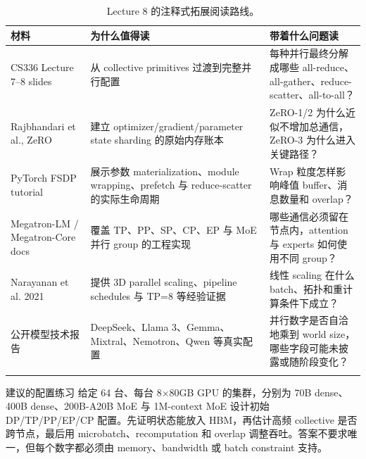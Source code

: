 \documentclass[a4paper]{article}
\begin{document}
\begin{longtable}{L{0.23\textwidth}L{0.31\textwidth}L{0.36\textwidth}}
\toprule
材料 & 为什么值得读 & 带着什么问题读 \\
\midrule
CS336 Lecture 7--8 slides & 从 collective primitives 过渡到完整并行配置 & 每种并行最终分解成哪些 all-reduce、all-gather、reduce-scatter、all-to-all？ \\
Rajbhandari et al., ZeRO & 建立 optimizer/gradient/parameter state sharding 的原始内存账本 & ZeRO-1/2 为什么近似不增加总通信，ZeRO-3 为什么进入关键路径？ \\
PyTorch FSDP tutorial & 展示参数 materialization、module wrapping、prefetch 与 reduce-scatter 的实际生命周期 & Wrap 粒度怎样影响峰值 buffer、消息数量和 overlap？ \\
Megatron-LM / Megatron-Core docs & 覆盖 TP、PP、SP、CP、EP 与 MoE 并行 group 的工程实现 & 哪些通信必须留在节点内，attention 与 experts 如何使用不同 group？ \\
Narayanan et al. 2021 & 提供 3D parallel scaling、pipeline schedules 与 TP=8 等经验证据 & 线性 scaling 在什么 batch、拓扑和重计算条件下成立？ \\
公开模型技术报告 & DeepSeek、Llama 3、Gemma、Mixtral、Nemotron、Qwen 等真实配置 & 并行数字是否自洽地乘到 world size，哪些字段可能未披露或随阶段变化？ \\
\bottomrule
\caption{Lecture 8 的注释式拓展阅读路线。}
\end{longtable}

\begin{importantbox}{建议的配置练习}
给定 64 台、每台 8×80GB GPU 的集群，分别为 70B dense、400B dense、200B-A20B MoE 与 1M-context MoE 设计初始 DP/TP/PP/EP/CP 配置。先证明状态能放入 HBM，再估计高频 collective 是否跨节点，最后用 microbatch、recomputation 和 overlap 调整吞吐。答案不要求唯一，但每个数字都必须由 memory、bandwidth 或 batch constraint 支持。
\end{importantbox}
\end{document}
